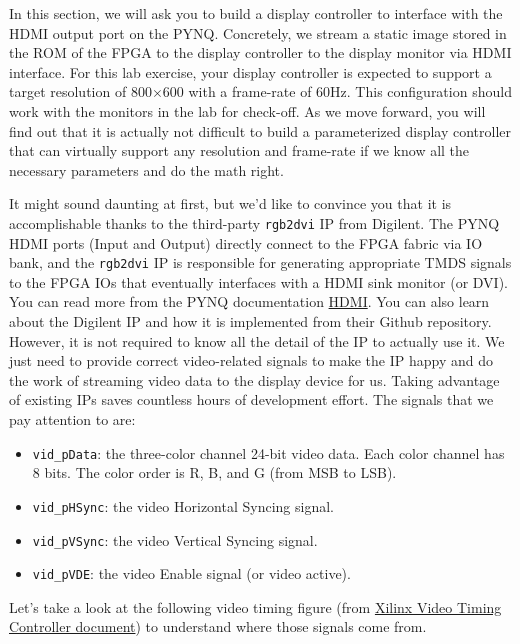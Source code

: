 \documentclass[11pt]{article}
\begin{document}
In this section, we will ask you to build a display controller to interface with the HDMI output port on the PYNQ. Concretely, we stream a static image stored in the ROM of the FPGA to the display controller to the display monitor via HDMI interface. For this lab exercise, your display controller is expected to support a target resolution of 800$\times$600 with a frame-rate of 60Hz. This configuration should work with the monitors in the lab for check-off. As we move forward, you will find out that it is actually not difficult to build a parameterized display controller that can virtually support any resolution and frame-rate if we know all the necessary parameters and do the math right.

It might sound daunting at first, but we'd like to convince you that it is accomplishable thanks to the third-party \verb|rgb2dvi| IP from Digilent. The PYNQ HDMI ports (Input and Output) directly connect to the FPGA fabric via IO bank, and the \verb|rgb2dvi| IP is responsible for generating appropriate TMDS signals to the FPGA IOs that eventually interfaces with a HDMI sink monitor (or DVI). You can read more from the PYNQ documentation \href{https://reference.digilentinc.com/reference/programmable-logic/pynq-z1/reference-manual#hdmi}{HDMI}. You can also learn about the Digilent IP and how it is implemented from their Github repository. However, it is not required to know all the detail of the IP to actually use it. We just need to provide correct video-related signals to make the IP happy and do the work of streaming video data to the display device for us. Taking advantage of existing IPs saves countless hours of development effort. The signals that we pay attention to are:

\begin{itemize}
  \item \verb|vid_pData|: the three-color channel 24-bit video data. Each color channel has 8 bits. The color order is R, B, and G (from MSB to LSB).
  \item \verb|vid_pHSync|: the video Horizontal Syncing signal.
  \item \verb|vid_pVSync|: the video Vertical Syncing signal.
  \item \verb|vid_pVDE|: the video Enable signal (or video active).
\end{itemize}

Let's take a look at the following video timing figure (from \href{https://www.xilinx.com/support/documentation/ip_documentation/v_tc/v6_2/pg016_v_tc.pdf}{Xilinx Video Timing Controller document}) to understand where those signals come from.
\end{document}
